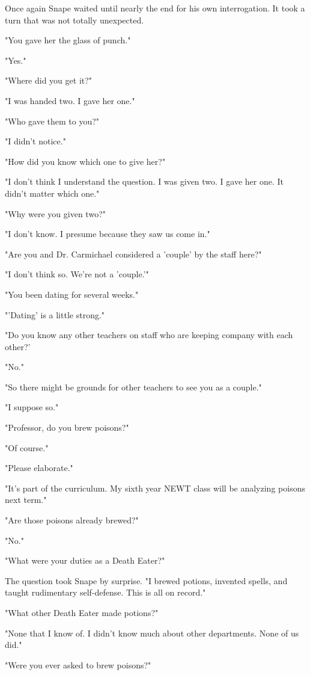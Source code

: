 \documentclass[a4paper,11pt]{article}
\begin{document}
Once again Snape waited until nearly the end for his own interrogation. It took a turn that was not totally unexpected.

"You gave her the glass of punch."

"Yes."

"Where did you get it?"

"I was handed two. I gave her one."

"Who gave them to you?"

"I didn't notice."

"How did you know which one to give her?"

"I don't think I understand the question. I was given two. I gave her one. It didn't matter which one."

"Why were you given two?"

"I don't know. I presume because they saw us come in."

"Are you and Dr. Carmichael considered a 'couple' by the staff here?"

"I don't think so. We're not a 'couple.'"

"You been dating for several weeks."

"'Dating' is a little strong."

"Do you know any other teachers on staff who are keeping company with each other?'

"No."

"So there might be grounds for other teachers to see you as a couple."

"I suppose so."

"Professor, do you brew poisons?"

"Of course."

"Please elaborate."

"It's part of the curriculum. My sixth year NEWT class will be analyzing poisons next term."

"Are those poisons already brewed?"

"No."

"What were your duties as a Death Eater?"

The question took Snape by surprise. "I brewed potions, invented spells, and taught rudimentary self-defense. This is all on record."

"What other Death Eater made potions?"

"None that I know of. I didn't know much about other departments. None of us did."

"Were you ever asked to brew poisons?"
\end{document}
